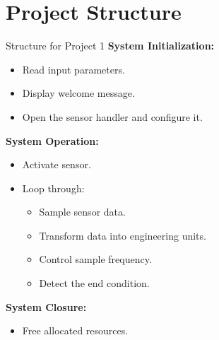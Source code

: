 \section{Project Structure}
\begin{frame}{Structure for Project 1}
    \textbf{System Initialization:}
    \begin{itemize}
        \item Read input parameters.
        \item Display welcome message.
        \item Open the sensor handler and configure it.
    \end{itemize}
    \textbf{System Operation:}
    \begin{itemize}
        \item Activate sensor.
        \item Loop through:
        \begin{itemize}
            \item Sample sensor data.
            \item Transform data into engineering units.
            \item Control sample frequency.
            \item Detect the end condition.
        \end{itemize}
    \end{itemize}
    \textbf{System Closure:}
    \begin{itemize}
        \item Free allocated resources.
    \end{itemize}
\end{frame}


